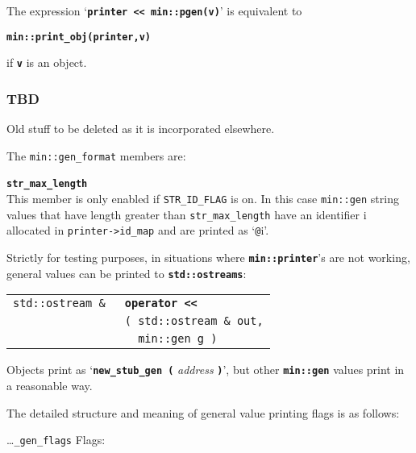 \documentclass[12pt]{article}
\makeatletter
\newcommand{\TT}[1]{{\tt \bfseries #1}}
\newcommand{\ttmkey}[2]{\TT{#1}\index{#1@{\tt #1}!#2}}
\newcommand{\ttomkey}[3]{\TT{operator #2}\index{#1@{\tt operator #2}!{#3}}}
\newcommand{\EOL}{\penalty \exhyphenpenalty}
\newenvironment{indpar}[1][0.3in]%
	{\begin{list}{}%
		     {\setlength{\itemsep}{0in}%
		      \setlength{\topsep}{0in}%
		      \setlength{\parsep}{1ex}%
		      \setlength{\labelwidth}{#1}%
		      \setlength{\leftmargin}{#1}%
		      \addtolength{\leftmargin}{\labelsep}}%
	 \item}%
	{\end{list}}
\newenvironment{itemlist}[1][1.2in]%
	{\begin{list}{}{\setlength{\labelwidth}{#1}%
		        \setlength{\leftmargin}{\labelwidth}%
		        \addtolength{\leftmargin}{+0.2in}%
		        \renewcommand{\makelabel}[1]{##1\hfill}}}%
	{\end{list}}
\newcommand{\LABEL}[1]{\label{#1}}
\newlength{\ARGBREAKLENGTH}
\newcommand{\ARGBREAK}[1][\ARGBREAKLENGTH]{\\&\hspace*{#1}}
\newcommand{\TTOMKEY}[3]{\ttomkey{#1}{#2}{#3}}
\makeatother
\begin{document}
The expression `\TT{printer~<{}<~min::pgen(v)}' is equivalent to
\begin{center}
\TT{min::print\_obj(printer,v)}
\end{center}
if \TT{v} is an object.


\subsubsection{TBD}

Old stuff to be deleted as it is incorporated elsewhere.

The {\tt min::gen\_format} members are:

\begin{itemlist}[0.4in]

\item[\ttmkey{str\_max\_length}{in {\tt min::gen\_format}}]~\\
This member is only enabled if {\tt STR\_\EOL ID\_\EOL FLAG} is on.
In this case {\tt min::gen} string values that have length greater
than {\tt str\_\EOL max\_\EOL length} have an identifier i allocated
in {\tt printer->\EOL id\_\EOL map} and are printed as `{\tt @}i'.

\end{itemlist}

Strictly for testing purposes, in situations where \TT{min::printer}'s
are not working, general values can be printed to \TT{std::ostreams}:

\begin{indpar}[1em]\begin{tabular}{r@{}l}
\verb|std::ostream & |
    & \TTOMKEY{<<}{<{}<}{of {\tt std::ostream \&}}\ARGBREAK
      \verb|( std::ostream & out,|\ARGBREAK
      \verb|  min::gen g )|
\LABEL{OPERATOR<<_OF_OSTREAM_AND_GEN} \\
\end{tabular}\end{indpar}

Objects print as `\TT{new\_stub\_gen (} {\em address} \TT{)}',
but other \TT{min::gen} values print in a reasonable way.

The detailed structure and meaning of general value printing flags 
is as follows:

\ldots{\tt \_gen\_flags} Flags:
\end{document}
